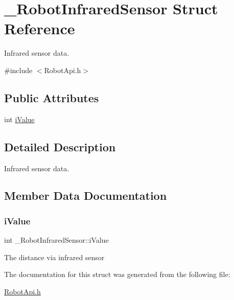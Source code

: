\hypertarget{struct__RobotInfraredSensor}{}\section{\+\_\+\+Robot\+Infrared\+Sensor Struct Reference}
\label{struct__RobotInfraredSensor}


Infrared sensor data.  




{\ttfamily \#include $<$Robot\+Api.\+h$>$}

\subsection*{Public Attributes}
\begin{DoxyCompactItemize}
\item 
int \hyperlink{struct__RobotInfraredSensor_adc590c79e4a6f32cc761bb95f6235986}{i\+Value}
\end{DoxyCompactItemize}


\subsection{Detailed Description}
Infrared sensor data. 

\subsection{Member Data Documentation}
\mbox{\label{struct__RobotInfraredSensor_adc590c79e4a6f32cc761bb95f6235986}} 
\subsubsection{\texorpdfstring{i\+Value}{iValue}}
{\footnotesize\ttfamily int \+\_\+\+Robot\+Infrared\+Sensor\+::i\+Value}

The distance via infrared sensor 

The documentation for this struct was generated from the following file\+:\begin{DoxyCompactItemize}
\item 
\hyperlink{RobotApi_8h}{Robot\+Api.\+h}\end{DoxyCompactItemize}
